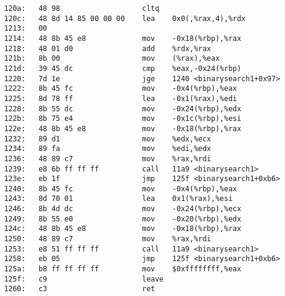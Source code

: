 \begin{mycode}
\begin{verbatim}
    120a:	48 98                	cltq
    120c:	48 8d 14 85 00 00 00 	lea    0x0(,%rax,4),%rdx
    1213:	00 
    1214:	48 8b 45 e8          	mov    -0x18(%rbp),%rax
    1218:	48 01 d0             	add    %rdx,%rax
    121b:	8b 00                	mov    (%rax),%eax
    121d:	39 45 dc             	cmp    %eax,-0x24(%rbp)
    1220:	7d 1e                	jge    1240 <binarysearch1+0x97>
    1222:	8b 45 fc             	mov    -0x4(%rbp),%eax
    1225:	8d 78 ff             	lea    -0x1(%rax),%edi
    1228:	8b 55 dc             	mov    -0x24(%rbp),%edx
    122b:	8b 75 e4             	mov    -0x1c(%rbp),%esi
    122e:	48 8b 45 e8          	mov    -0x18(%rbp),%rax
    1232:	89 d1                	mov    %edx,%ecx
    1234:	89 fa                	mov    %edi,%edx
    1236:	48 89 c7             	mov    %rax,%rdi
    1239:	e8 6b ff ff ff       	call   11a9 <binarysearch1>
    123e:	eb 1f                	jmp    125f <binarysearch1+0xb6>
    1240:	8b 45 fc             	mov    -0x4(%rbp),%eax
    1243:	8d 70 01             	lea    0x1(%rax),%esi
    1246:	8b 4d dc             	mov    -0x24(%rbp),%ecx
    1249:	8b 55 e0             	mov    -0x20(%rbp),%edx
    124c:	48 8b 45 e8          	mov    -0x18(%rbp),%rax
    1250:	48 89 c7             	mov    %rax,%rdi
    1253:	e8 51 ff ff ff       	call   11a9 <binarysearch1>
    1258:	eb 05                	jmp    125f <binarysearch1+0xb6>
    125a:	b8 ff ff ff ff       	mov    $0xffffffff,%eax
    125f:	c9                   	leave
    1260:	c3                   	ret


\end{verbatim}
\end{mycode}
